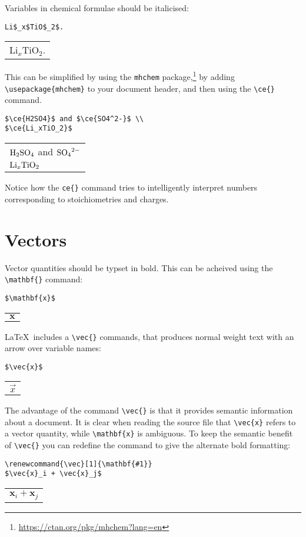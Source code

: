 \documentclass[a4paper]{tufte-handout}
\begin{document}
Variables in chemical formulae should be italicised:
\begin{lstlisting}
Li$_x$TiO$_2$.
\end{lstlisting}
\begin{tabular}{|p{10cm}}
Li$_x$TiO$_2$.
\end{tabular}

This can be simplified by using the \lstinline{mhchem} package,\footnote{\url{https://ctan.org/pkg/mhchem?lang=en}} by adding \lstinline$\usepackage{mhchem}$ to your document header, and then using the \lstinline$\ce{}$ command.
\begin{lstlisting}
$\ce{H2SO4}$ and $\ce{SO4^2-}$ \\
$\ce{Li_xTiO_2}$
\end{lstlisting}
\begin{tabular}{|p{10cm}}
$\ce{H2SO4}$ and $\ce{SO4^2-}$ \\
$\ce{Li_xTiO2}$
\end{tabular}

Notice how the \lstinline$ce{}$ command tries to intelligently interpret numbers corresponding to stoichiometries and charges.

\section{Vectors}
Vector quantities should be typset in bold. This can be acheived using the \lstinline$\mathbf{}$ command:
\begin{lstlisting}
$\mathbf{x}$
\end{lstlisting}
\begin{tabular}{|p{10cm}}
$\mathbf{x}$
\end{tabular}

\LaTeX\ includes a \lstinline$\vec{}$ commands, that produces normal weight text with an arrow over variable names:
\begin{lstlisting}
$\vec{x}$
\end{lstlisting}
\begin{tabular}{|p{10cm}}
$\vec{x}$
\end{tabular}

The advantage of the command \lstinline$\vec{}$ is that it provides semantic information about a document. It is clear when reading the source file that \lstinline$\vec{x}$ refers to a vector quantity, while \lstinline$\mathbf{x}$ is ambiguous. To keep the semantic benefit of \lstinline$\vec{}$ you can redefine the command to give the alternate bold formatting:
\begin{lstlisting}
\renewcommand{\vec}[1]{\mathbf{#1}}
$\vec{x}_i + \vec{x}_j$
\end{lstlisting}
\begin{tabular}{|p{10cm}}
\renewcommand{\vec}[1]{\mathbf{#1}}
$\vec{x}_i + \vec{x}_j$
\end{tabular}
\end{document}
